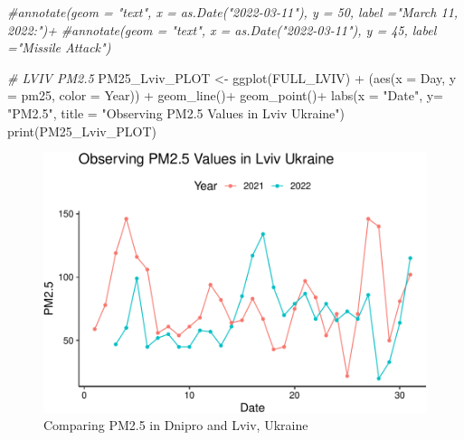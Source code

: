 \documentclass[
  12pt,
]{article}
\newenvironment{Shaded}{\begin{snugshade}}{\end{snugshade}}
\newcommand{\AttributeTok}[1]{\textcolor[rgb]{0.77,0.63,0.00}{#1}}
\newcommand{\CommentTok}[1]{\textcolor[rgb]{0.56,0.35,0.01}{\textit{#1}}}
\newcommand{\FunctionTok}[1]{\textcolor[rgb]{0.00,0.00,0.00}{#1}}
\newcommand{\NormalTok}[1]{#1}
\newcommand{\OtherTok}[1]{\textcolor[rgb]{0.56,0.35,0.01}{#1}}
\newcommand{\SpecialCharTok}[1]{\textcolor[rgb]{0.00,0.00,0.00}{#1}}
\newcommand{\StringTok}[1]{\textcolor[rgb]{0.31,0.60,0.02}{#1}}
\begin{document}
\begin{Shaded}
\begin{Highlighting}[]
  \CommentTok{\#annotate(geom = "text", x = as.Date("2022{-}03{-}11"), y = 50, label ="March 11, 2022:")+ }
  \CommentTok{\#annotate(geom = "text", x = as.Date("2022{-}03{-}11"), y = 45, label ="Missile Attack")}




\CommentTok{\# LVIV PM2.5}
\NormalTok{PM25\_Lviv\_PLOT }\OtherTok{\textless{}{-}} 
  \FunctionTok{ggplot}\NormalTok{(FULL\_LVIV) }\SpecialCharTok{+} 
\NormalTok{(}\FunctionTok{aes}\NormalTok{(}\AttributeTok{x =}\NormalTok{ Day, }\AttributeTok{y =}\NormalTok{ pm25, }\AttributeTok{color =}\NormalTok{ Year)) }\SpecialCharTok{+} 
              \FunctionTok{geom\_line}\NormalTok{()}\SpecialCharTok{+}  
  \FunctionTok{geom\_point}\NormalTok{()}\SpecialCharTok{+}
  \FunctionTok{labs}\NormalTok{(}\AttributeTok{x =} \StringTok{"Date"}\NormalTok{, }\AttributeTok{y=} \StringTok{"PM2.5"}\NormalTok{,}
       \AttributeTok{title =} \StringTok{"Observing PM2.5 Values in Lviv Ukraine"}\NormalTok{)}
\FunctionTok{print}\NormalTok{(PM25\_Lviv\_PLOT)}
\end{Highlighting}
\end{Shaded}

\begin{figure}
\centering
\includegraphics{Fontanie_Gordon_Weinberg_Project_files/figure-latex/Plotting.PM25-2.pdf}
\caption{Comparing PM2.5 in Dnipro and Lviv, Ukraine}
\end{figure}
\end{document}
